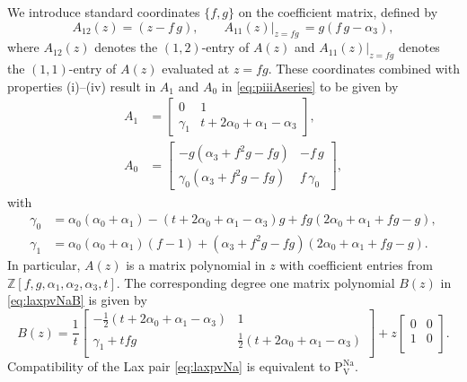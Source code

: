 \documentclass[a4paper,reqno]{amsart}
\numberwithin{equation}{section}
\numberwithin{figure}{section}
\theoremstyle{remark}
\newcommand\Pfive{\textrm{P}_{\textrm{V}}}
\begin{document}
We introduce standard coordinates $\{f,g\}$ on the coefficient matrix, defined by 
\begin{equation*}
    A_{12}(z)=(z-f\,g),\qquad A_{11}(z)|_{z=fg}\,=g(f\,g-\alpha_3),
\end{equation*}
where $A_{12}(z)$ denotes the $(1,2)$-entry of $A(z)$ and $A_{11}(z)|_{z=fg}$ denotes the $(1,1)$-entry of $A(z)$ evaluated at $z=fg$. 
These coordinates combined with properties (i)--(iv) result in $A_1$ and $A_0$ in \eqref{eq:piiiAseries} to be given by
\begin{align*}
A_1&=\begin{bmatrix}
    0 & 1\\
    \gamma_1 & t+2\alpha_0+\alpha_1-\alpha_3
\end{bmatrix},\\
A_0&=\begin{bmatrix}
    -g(\alpha_3+f^2g-fg) & -f\,g\\
    \gamma_0(\alpha_3+f^2g-fg) & f\,\gamma_0
\end{bmatrix},
\end{align*}
with
\begin{align*}
    \gamma_0&=\alpha_0(\alpha_0+\alpha_1)-(t+2\alpha_0+\alpha_1-\alpha_3)g+fg(2\alpha_0+\alpha_1+fg-g),\\
    \gamma_1&=\alpha_0(\alpha_0+\alpha_1)(f-1)+(\alpha_3+f^2g-fg)(2\alpha_0+\alpha_1+fg-g).
\end{align*}
In particular, $A(z)$ is a matrix polynomial in $z$ with coefficient entries from $\mathbb{Z}[f,g,\alpha_1,\alpha_2,\alpha_3,t]$.
The corresponding degree one matrix polynomial $B(z)$ in \eqref{eq:laxpvNaB} is given by
\begin{equation*}
    B(z)=\frac{1}{t}\begin{bmatrix}
 -\frac{1}{2}(t+2\alpha_0+\alpha_1-\alpha_3) & 1 \\
 \gamma_1+tfg & \frac{1}{2}(t+2\alpha_0+\alpha_1-\alpha_3) \\
\end{bmatrix}+z\begin{bmatrix}
 0 & 0 \\
 1 & 0\\
\end{bmatrix}.
\end{equation*}
Compatibility of the Lax pair \eqref{eq:laxpvNa} is equivalent to $\Pfive^\text{Na}$.
\end{document}
